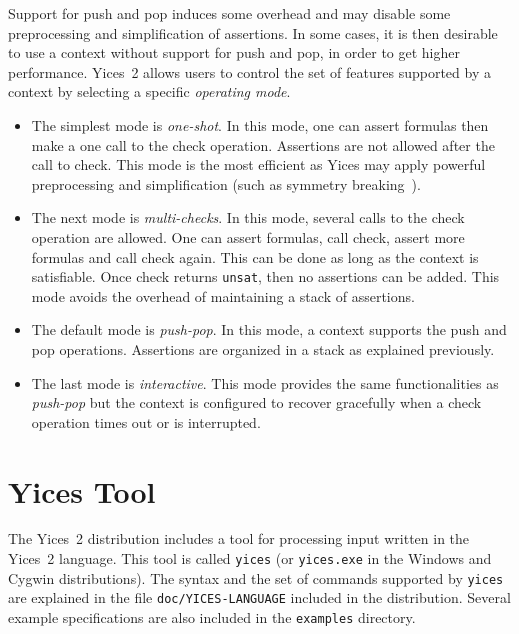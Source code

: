 \documentclass[11pt,twoside,fleqn,openright,titlepage]{cslreport}
\begin{document}
Support for  push and pop induces  some overhead and  may disable some
preprocessing and  simplification of assertions. In some  cases, it is
then desirable to  use a context without support for  push and pop, in
order to get  higher performance. Yices~2 allows users  to control the
set of  features supported by a  context by selecting  a specific {\em
  operating mode\/}.
\begin{itemize}
\item The simplest mode is {\em one-shot\/}. In this mode, one can
  assert formulas then make a one call to the check operation.
  Assertions are not allowed after the call to check. This mode is the
  most efficient as Yices may apply powerful preprocessing and
  simplification (such as symmetry breaking~\cite{Deharbe+etal:2011}).
\item The next mode is {\em multi-checks\/}. In this mode, several calls
  to the check operation are allowed. One can assert formulas, call
  check, assert more formulas and call check again. This can be done
  as long as the context is satisfiable. Once check returns
  \texttt{unsat}, then no assertions can be added. This mode avoids
  the overhead of maintaining a stack of assertions.
\item The default mode is {\em push-pop\/}. In this mode, a context
  supports the push and pop operations. Assertions are organized in a
  stack as explained previously.
\item The last mode is {\em interactive\/}. This mode provides the
  same functionalities as {\em push-pop\/} but the context is
  configured to recover gracefully when a check operation times out or
  is interrupted.
\end{itemize}



\chapter{Yices Tool}
\label{yices-shell}

The Yices~2 distribution includes  a tool for processing input written
in  the Yices~2  language.  This  tool is  called  \texttt{yices} (or
\texttt{yices.exe}  in  the Windows  and  Cygwin distributions).   The
syntax  and  the  set  of  commands supported  by  \texttt{yices}  are
explained  in  the file  \texttt{doc/YICES-LANGUAGE}  included in  the
distribution. Several example specifications  are also included in the
\texttt{examples} directory.
\end{document}
